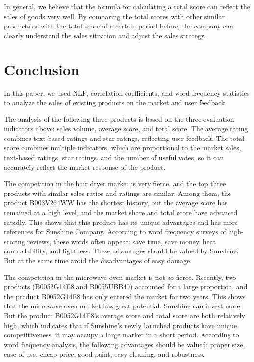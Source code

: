 \documentclass{mcmthesis}
\begin{document}
	In general, we believe that the formula for calculating a total score can reflect the sales of goods very well. By comparing the total scores with other similar products or with the total score of a certain period before, the company can clearly understand the sales situation and adjust the sales strategy.
	
	
	\section{Conclusion}
	
	In this paper, we used NLP, correlation coefficients, and word frequency statistics to analyze the sales of existing products on the market and user feedback.
	
	The analysis of the following three products is based on the three evaluation indicators above: sales volume, average score, and total score. The average rating combines text-based ratings and star ratings, reflecting user feedback. The total score combines multiple indicators, which are proportional to the market sales, text-based ratings, star ratings, and the number of useful votes, so it can accurately reflect the market response of the product.
	
	The competition in the hair dryer market is very fierce, and the top three products with similar sales ratios and ratings are similar. Among them, the product B003V264WW has the shortest history, but the average score has remained at a high level, and the market share and total score have advanced rapidly. This shows that this product has its unique advantages and has more references for Sunshine Company. According to word frequency surveys of high-scoring reviews, these words often appear: save time, save money, heat controllability, and lightness. These advantages should be valued by Sunshine. But at the same time avoid the disadvantages of easy damage.
	
	The competition in the microwave oven market is not so fierce. Recently, two products (B0052G14E8 and B0055UBB40) accounted for a large proportion, and the product B0052G14E8 has only entered the market for two years. This shows that the microwave oven market has great potential. Sunshine can invest more. But the product B0052G14E8's average score and total score are both relatively high, which indicates that if Sunshine's newly launched products have unique competitiveness, it may occupy a large market in a short period. According to word frequency analysis, the following advantages should be valued: proper size, ease of use, cheap price, good paint, easy cleaning, and robustness.
	
\end{document}
